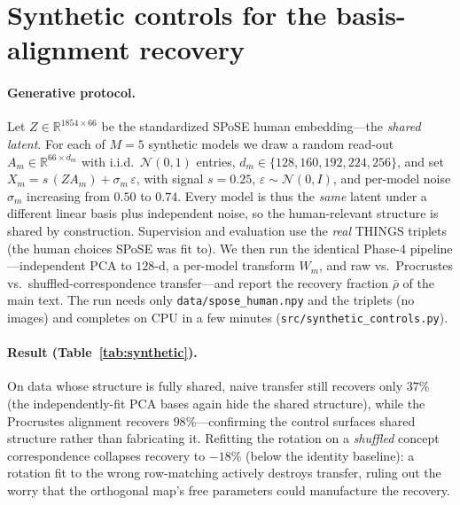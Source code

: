 \documentclass{article}
\begin{document}
\section{Synthetic controls for the basis-alignment recovery}\label{app:synthetic}
\paragraph{Generative protocol.} Let $Z\in\mathbb{R}^{1854\times 66}$ be the
standardized SPoSE human embedding---the \emph{shared latent}. For each of $M{=}5$
synthetic models we draw a random read-out $A_m\in\mathbb{R}^{66\times d_m}$ with
i.i.d.\ $\mathcal{N}(0,1)$ entries, $d_m\in\{128,160,192,224,256\}$, and set
$X_m = s\,(Z A_m) + \sigma_m\,\varepsilon$, with signal $s{=}0.25$,
$\varepsilon\sim\mathcal{N}(0,I)$, and per-model noise $\sigma_m$ increasing from $0.50$
to $0.74$. Every model is thus the \emph{same} latent under a different linear basis
plus independent noise, so the human-relevant structure is shared by construction.
Supervision and evaluation use the \emph{real} THINGS triplets (the human choices SPoSE
was fit to). We then run the identical Phase-4 pipeline---independent PCA to $128$-d, a
per-model transform $W_m$, and raw vs.\ Procrustes vs.\ shuffled-correspondence
transfer---and report the recovery fraction $\bar\rho$ of the main text. The run needs
only \texttt{data/spose\_human.npy} and the triplets (no images) and completes on CPU in
a few minutes (\texttt{src/synthetic\_controls.py}).

\paragraph{Result (Table~\ref{tab:synthetic}).} On data whose structure is fully shared,
naive transfer still recovers only $37\%$ (the independently-fit PCA bases again hide the
shared structure), while the Procrustes alignment recovers $98\%$---confirming the
control surfaces shared structure rather than fabricating it. Refitting the rotation on a
\emph{shuffled} concept correspondence collapses recovery to $-18\%$ (below the identity
baseline): a rotation fit to the wrong row-matching actively destroys transfer, ruling
out the worry that the orthogonal map's free parameters could manufacture the recovery.
\end{document}
